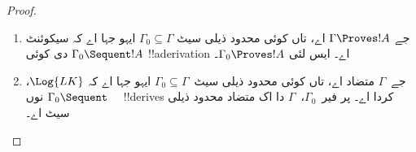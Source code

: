 \documentclass[../../../include/open-logic-section]{subfiles}
\begin{document}
\begin{proof}
  \begin{enumerate}
    \item جے $\Gamma \Proves !A$ اے، تاں کوئی محدود ذیلی سیٹ
      $\Gamma_0 \subseteq \Gamma$ ایہو جہا اے کہ سیکوئنٹ $\Gamma_0
      \Sequent !A$ دی کوئی !!a{derivation} اے۔ ایس لئی $\Gamma_0
      \Proves !A$۔
    \item جے~$\Gamma$ متضاد اے، تاں کوئی محدود ذیلی سیٹ~$\Gamma_0
      \subseteq \Gamma$ ایہو جہا اے کہ $\Log{LK}$، $\Gamma_0 \Sequent
      \quad$ نوں !!{derive}s کردا اے۔ پر فیر~$\Gamma_0$،~$\Gamma$ دا اک
      متضاد محدود ذیلی سیٹ اے۔
  \end{enumerate}
\end{proof}
\end{document}
